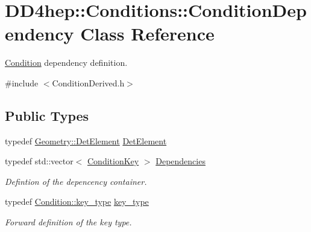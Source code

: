 \hypertarget{class_d_d4hep_1_1_conditions_1_1_condition_dependency}{
\section{DD4hep::Conditions::ConditionDependency Class Reference}
\label{class_d_d4hep_1_1_conditions_1_1_condition_dependency}
}


\hyperlink{class_d_d4hep_1_1_conditions_1_1_condition}{Condition} dependency definition.  


{\ttfamily \#include $<$ConditionDerived.h$>$}\subsection*{Public Types}
\begin{DoxyCompactItemize}
\item 
typedef \hyperlink{class_d_d4hep_1_1_geometry_1_1_det_element}{Geometry::DetElement} \hyperlink{class_d_d4hep_1_1_conditions_1_1_condition_dependency_a0a9ea458cf85d1d76dec51d85830f738}{DetElement}
\item 
typedef std::vector$<$ \hyperlink{class_d_d4hep_1_1_conditions_1_1_condition_key}{ConditionKey} $>$ \hyperlink{class_d_d4hep_1_1_conditions_1_1_condition_dependency_af1594501f40e514c5748092b94e4fd84}{Dependencies}
\begin{DoxyCompactList}\small\item\em Defintion of the depencency container. \item\end{DoxyCompactList}\item 
typedef \hyperlink{class_d_d4hep_1_1_conditions_1_1_condition_a7528efa762e8cc072ef80ea67c3531f9}{Condition::key\_\-type} \hyperlink{class_d_d4hep_1_1_conditions_1_1_condition_dependency_aeeb9606d1e1aae0a6eb4063ccfd1fca2}{key\_\-type}
\begin{DoxyCompactList}\small\item\em Forward definition of the key type. \item\end{DoxyCompactList}\end{DoxyCompactItemize}
